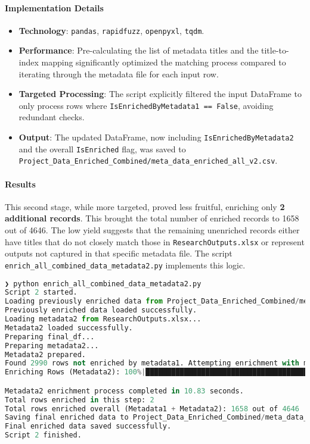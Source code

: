 \documentclass[12pt]{article}
\providecommand{\tightlist}{%
  \setlength{\itemsep}{0pt}\setlength{\parskip}{0pt}}
\begin{document}
\paragraph{Implementation
Details}\label{implementation-details-4}

\begin{itemize}
\tightlist
\item
  \textbf{Technology}: \texttt{pandas}, \texttt{rapidfuzz},
  \texttt{openpyxl}, \texttt{tqdm}.
\item
  \textbf{Performance}: Pre-calculating the list of metadata titles and
  the title-to-index mapping significantly optimized the matching
  process compared to iterating through the metadata file for each input
  row.
\item
  \textbf{Targeted Processing}: The script explicitly filtered the input
  DataFrame to only process rows where
  \texttt{IsEnrichedByMetadata1\ ==\ False}, avoiding redundant checks.
\item
  \textbf{Output}: The updated DataFrame, now including
  \texttt{IsEnrichedByMetadata2} and the overall \texttt{IsEnriched}
  flag, was saved to
  \texttt{Project\_Data\_Enriched\_Combined/meta\_data\_enriched\_all\_v2.csv}.
\end{itemize}

\paragraph{Results}\label{results-3}

This second stage, while more targeted, proved less fruitful, enriching
only \textbf{2 additional records}. This brought the total number of
enriched records to 1658 out of 4646. The low yield suggests that the
remaining unenriched records either have titles that do not closely
match those in \texttt{ResearchOutputs.xlsx} or represent outputs not
captured in that specific metadata file. The script
\texttt{enrich\_all\_combined\_data\_metadata2.py} implements this
logic.

\begin{lstlisting}[language=Python]
❯ python enrich_all_combined_data_metadata2.py
Script 2 started.
Loading previously enriched data from Project_Data_Enriched_Combined/meta_data_enriched_all.csv...
Previously enriched data loaded successfully.
Loading metadata2 from ResearchOutputs.xlsx...
Metadata2 loaded successfully.
Preparing final_df...
Preparing metadata2...
Metadata2 prepared.
Found 2990 rows not enriched by metadata1. Attempting enrichment with metadata2...
Enriching Rows (Metadata2): 100%|███████████████████████████████████████████████████████████████████████████████████████████████████████████████████████████████| 2990/2990 [00:10<00:00, 276.42it/s]

Metadata2 enrichment process completed in 10.83 seconds.
Total rows enriched in this step: 2
Total rows enriched overall (Metadata1 + Metadata2): 1658 out of 4646
Saving final enriched data to Project_Data_Enriched_Combined/meta_data_enriched_all_v2.csv...
Final enriched data saved successfully.
Script 2 finished.
\end{lstlisting}
\end{document}
